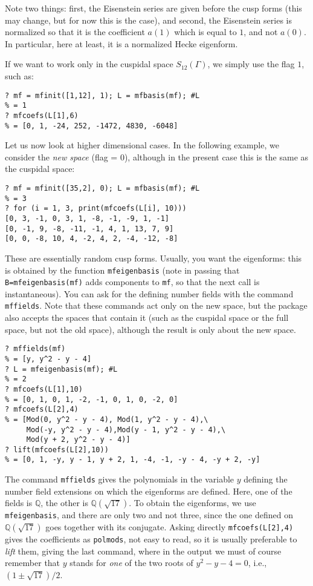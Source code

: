 \documentclass[11pt]{article}
\newcommand{\Q}{{\mathbb Q}}
\newcommand{\G}{\Gamma}
\def\kbd#1{{\tt #1}}
\begin{document}
Note two things: first, the Eisenstein series are given before the cusp forms
(this may change, but for now this is the case), and second, the Eisenstein
series is normalized so that it is the coefficient $a(1)$ which is equal to
$1$, and not $a(0)$. In particular, here at least, it is a normalized
Hecke eigenform.

If we want to work only in the cuspidal space $S_{12}(\G)$, we simply use
the flag $1$, such as:

\begin{verbatim}
? mf = mfinit([1,12], 1); L = mfbasis(mf); #L
% = 1
? mfcoefs(L[1],6)
% = [0, 1, -24, 252, -1472, 4830, -6048]
\end{verbatim}

Let us now look at higher dimensional cases. In the following example, we
consider the \emph{new space} (flag = $0$), although in the present case
this is the same as the cuspidal space:

\begin{verbatim}
? mf = mfinit([35,2], 0); L = mfbasis(mf); #L
% = 3
? for (i = 1, 3, print(mfcoefs(L[i], 10)))
[0, 3, -1, 0, 3, 1, -8, -1, -9, 1, -1]
[0, -1, 9, -8, -11, -1, 4, 1, 13, 7, 9]
[0, 0, -8, 10, 4, -2, 4, 2, -4, -12, -8]
\end{verbatim}

These are essentially random cusp forms. Usually, you want the eigenforms:
this is obtained by the function \kbd{mfeigenbasis} (note in passing that
\kbd{B=mfeigenbasis(mf)} adds components to \kbd{mf}, so that the next
call is instantaneous). You can ask for the defining number fields with the
command \kbd{mffields}. Note that these commands act only on the new space,
but the package also accepts the spaces that contain it (such as the cuspidal
space or the full space, but not the old space), although the result is only
about the new space.

\begin{verbatim}
? mffields(mf)
% = [y, y^2 - y - 4]
? L = mfeigenbasis(mf); #L
% = 2
? mfcoefs(L[1],10)
% = [0, 1, 0, 1, -2, -1, 0, 1, 0, -2, 0]
? mfcoefs(L[2],4)
% = [Mod(0, y^2 - y - 4), Mod(1, y^2 - y - 4),\
     Mod(-y, y^2 - y - 4),Mod(y - 1, y^2 - y - 4),\
     Mod(y + 2, y^2 - y - 4)]
? lift(mfcoefs(L[2],10))
% = [0, 1, -y, y - 1, y + 2, 1, -4, -1, -y - 4, -y + 2, -y]
\end{verbatim}

The command \kbd{mffields} gives the polynomials in the variable $y$ defining
the number field extensions on which the eigenforms are defined. Here, one of
the fields is $\Q$, the other is $\Q(\sqrt{17})$. To obtain the eigenforms,
we use \kbd{mfeigenbasis}, and there are only two and not three, since the
one defined on $\Q(\sqrt{17})$ goes together with its conjugate. Asking
directly \kbd{mfcoefs(L[2],4)} gives the coefficients as \kbd{polmods}, not
easy to read, so it is usually preferable to \emph{lift} them, giving the
last command, where in the output we must of course remember that $y$ stands
for \emph{one} of the two roots of $y^2-y-4=0$, i.e., $(1\pm\sqrt{17})/2$.
\end{document}
